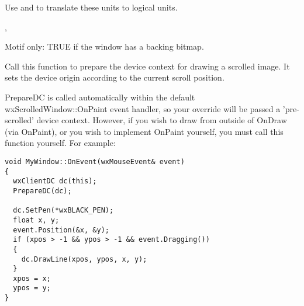 



Use  and \rtfsp
to translate these units to logical units.


,\rtfsp
{}



\label{wxscrolledwindowisretained}


Motif only: TRUE if the window has a backing bitmap.

\label{wxscrolledwindowpreparedc}


Call this function to prepare the device context for drawing a scrolled image. It
sets the device origin according to the current scroll position.

PrepareDC is called automatically within the default wxScrolledWindow::OnPaint event
handler, so your  override
will be passed a 'pre-scrolled' device context. However, if you wish to draw from
outside of OnDraw (via OnPaint), or you wish to implement OnPaint yourself, you must
call this function yourself. For example:

\begin{verbatim}
void MyWindow::OnEvent(wxMouseEvent& event)
{
  wxClientDC dc(this);
  PrepareDC(dc);

  dc.SetPen(*wxBLACK_PEN);
  float x, y;
  event.Position(&x, &y);
  if (xpos > -1 && ypos > -1 && event.Dragging())
  {
    dc.DrawLine(xpos, ypos, x, y);
  }
  xpos = x;
  ypos = y;
}
\end{verbatim}

